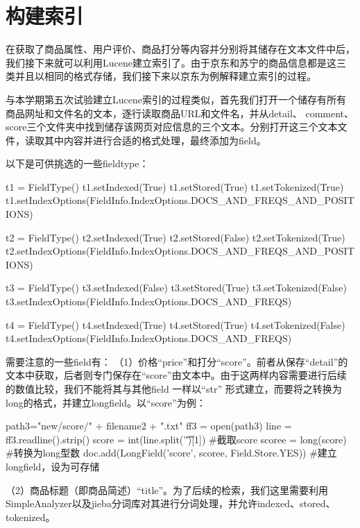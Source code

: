 \chapter{构建索引}
在获取了商品属性、用户评价、商品打分等内容并分别将其储存在文本文件中后，我们接下来就可以利用Lucene建立索引了。由于京东和苏宁的商品信息都是这三类并且以相同的格式存储，我们接下来以京东为例解释建立索引的过程。

与本学期第五次试验建立Lucene索引的过程类似，首先我们打开一个储存有所有商品网址和文件名的文本，逐行读取商品URL和文件名，并从detail、 comment、score三个文件夹中找到储存该网页对应信息的三个文本。分别打开这三个文本文件，读取其中内容并进行合适的格式处理，最终添加为field。

以下是可供挑选的一些fieldtype：
\begin{python}
t1 = FieldType()
        t1.setIndexed(True)
        t1.setStored(True)
        t1.setTokenized(True)
        t1.setIndexOptions(FieldInfo.IndexOptions.DOCS_AND_FREQS_AND_POSITIONS)

        t2 = FieldType()
        t2.setIndexed(True)
        t2.setStored(False)
        t2.setTokenized(True)
        t2.setIndexOptions(FieldInfo.IndexOptions.DOCS_AND_FREQS_AND_POSITIONS)

        t3 = FieldType()
        t3.setIndexed(False)
        t3.setStored(True)
        t3.setTokenized(False)
        t3.setIndexOptions(FieldInfo.IndexOptions.DOCS_AND_FREQS)

        t4 = FieldType()
        t4.setIndexed(True)
        t4.setStored(True)
        t4.setTokenized(False)
        t4.setIndexOptions(FieldInfo.IndexOptions.DOCS_AND_FREQS)
\end{python}

需要注意的一些field有：
（1）价格“price”和打分“score”。前者从保存“detail”的文本中获取，后者则专门保存在“score”由文本中。由于这两样内容需要进行后续的数值比较，我们不能将其与其他field 一样以“str” 形式建立，而要将之转换为long的格式，并建立longfield。以“score”为例：

\begin{python}
path3="new/score/" + filename2 + ".txt"
ff3 = open(path3)
line = ff3.readline().strip()
score = int(line.split('\t')[1])        #截取score
scoree = long(score)                    #转换为long型数
doc.add(LongField('score', scoree, Field.Store.YES)) #建立longfield，设为可存储
\end{python}


（2）商品标题（即商品简述）“title”。为了后续的检索，我们这里需要利用SimpleAnalyzer以及jieba分词库对其进行分词处理，并允许indexed、stored、tokenized。

